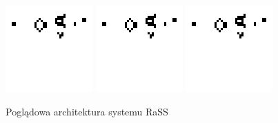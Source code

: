 \documentclass[a4paper,12pt,twoside]{article}
\begin{document}
\begin{figure}[htb]
\begin{center}
      \includegraphics[width=.75\textwidth]{test1.png}
      \includegraphics[width=.75\textwidth]{test1.png}
      \includegraphics[width=.75\textwidth]{test1.png}
    \caption{Poglądowa architektura systemu RaSS}
    \label{RaSS}
  \end{center}
\end{figure}
\end{document}
